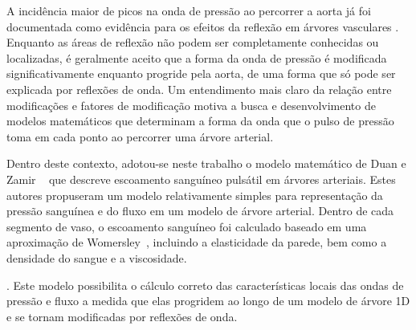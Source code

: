 
A incidência maior de picos na onda de pressão ao percorrer a aorta já foi documentada como evidência para os efeitos da reflexão em árvores vasculares \cite{Kouchoukos,Lighthill,McDonald}. Enquanto as áreas de reflexão não podem ser completamente conhecidas ou localizadas, é geralmente aceito que a forma da onda de pressão é modificada significativamente enquanto progride pela aorta, de uma forma que só pode ser explicada por reflexões de onda.  Um entendimento mais claro da relação entre modificações e fatores de modificação motiva a busca e desenvolvimento de modelos matemáticos que determinam a forma da onda que o pulso de pressão toma em cada ponto ao percorrer uma árvore arterial. 

Dentro deste contexto, adotou-se neste trabalho o modelo matemático de Duan e Zamir ~\cite{Duan,Duan1992} que descreve escoamento sanguíneo pulsátil em árvores arteriais. Estes autores propuseram um modelo relativamente simples para representação da pressão sanguínea e do fluxo em um modelo de árvore arterial. Dentro de cada segmento de vaso, o escoamento sanguíneo foi calculado baseado em uma aproximação de Womersley~\cite{WOMERSLEY55}, incluindo a elasticidade da parede, bem como a densidade do sangue e a viscosidade.

. Este modelo possibilita o cálculo correto das características locais das ondas de pressão e fluxo a medida que elas progridem ao longo de um modelo de árvore 1D e se tornam modificadas por reflexões de onda.


